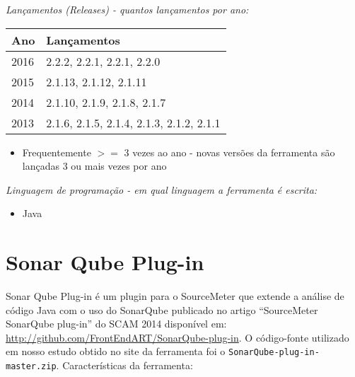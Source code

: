 \begin{description}

  \item {\it Lançamentos ({\it Releases}) - quantos lançamentos por ano:}
    \begin{table}[h!]
      \centering
      \begin{tabular}{| l | l |}
        \hline
        Ano  & Lançamentos                              \\
        \hline
        2016 & 2.2.2, 2.2.1, 2.2.1, 2.2.0               \\
        2015 & 2.1.13, 2.1.12, 2.1.11                   \\
        2014 & 2.1.10, 2.1.9, 2.1.8, 2.1.7              \\
        2013 & 2.1.6, 2.1.5, 2.1.4, 2.1.3, 2.1.2, 2.1.1 \\
        \hline
      \end{tabular}
    \end{table}
    \begin{itemize}
      \item Frequentemente $>=$ 3 vezes ao ano - novas versões da ferramenta são lançadas 3 ou mais vezes por ano
    \end{itemize}

  \item {\it Linguagem de programação - em qual linguagem a ferramenta é escrita:}
    \begin{itemize}
      \item Java
    \end{itemize}

\end{description}

\section{Sonar Qube Plug-in}

Sonar Qube Plug-in é um plugin para o SourceMeter que extende a análise de
código Java com o uso do SonarQube publicado no artigo ``SourceMeter SonarQube
plug-in'' do SCAM 2014 disponível em:
\url{http://github.com/FrontEndART/SonarQube-plug-in}. O código-fonte
utilizado em nosso estudo obtido no site da ferramenta foi o
\texttt{SonarQube-plug-in-master.zip}. Características da ferramenta:

